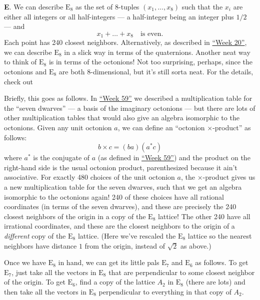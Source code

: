 \documentclass{article}
\def\tightlist{}
\renewcommand{\texttt}[1]{%
  \begingroup
  \ttfamily
  \begingroup\lccode`~=`/\lowercase{\endgroup\def~}{/\discretionary{}{}{}}%
  \begingroup\lccode`~=`[\lowercase{\endgroup\def~}{[\discretionary{}{}{}}%
  \begingroup\lccode`~=`.\lowercase{\endgroup\def~}{.\discretionary{}{}{}}%
  \catcode`/=\active\catcode`[=\active\catcode`.=\active
  \scantokens{#1\noexpand}%
  \endgroup
}
\begin{document}
\textbf{E}. We can describe \(\mathrm{E}_8\) as the set of 8-tuples
\((x_1,...,x_8)\) such that the \(x_i\) are either all integers or all
half-integers --- a half-integer being an integer plus \(1/2\) --- and
\[x_1+\ldots+x_8\quad\text{is even}.\] Each point has 240 closest
neighbors. Alternatively, as described in
\protect\hyperlink{week20}{``Week 20''}, we can describe
\(\mathrm{E}_8\) in a slick way in terms of the quaternions. Another
neat way to think of \(\mathrm{E}_8\) is in terms of the octonions! Not
too surprising, perhaps, since the octonions and \(\mathrm{E}_8\) are
both 8-dimensional, but it's still sorta neat. For the details, check
out


Briefly, this goes as follows. In \protect\hyperlink{week59}{``Week
59''} we described a multiplication table for the ``seven dwarves'' ---
a basis of the imaginary octonions --- but there are lots of other
multiplication tables that would also give an algebra isomorphic to the
octonions. Given any unit octonion \(a\), we can define an ``octonion
\(\times\)-product'' as follows: \[b \times c = (b a)(a^* c)\] where
\(a^*\) is the conjugate of \(a\) (as defined in
\protect\hyperlink{week59}{``Week 59''}) and the product on the
right-hand side is the usual octonion product, parenthesized because it
ain't associative. For exactly 480 choices of the unit octonion \(a\),
the \(\times\)-product gives us a new multiplication table for the seven
dwarves, such that we get an algebra isomorphic to the octonions again!
240 of these choices have all rational coordinates (in terms of the
seven dwarves), and these are precisely the 240 closest neighbors of the
origin in a copy of the \(\mathrm{E}_8\) lattice! The other 240 have all
irrational coordinates, and these are the closest neighbors to the
origin of a \emph{different} copy of the \(\mathrm{E}_8\) lattice. (Here
we've rescaled the \(\mathrm{E}_8\) lattice so the nearest neighbors
have distance \(1\) from the origin, instead of \(\sqrt{2}\) as above.)

Once we have \(\mathrm{E}_8\) in hand, we can get its little pals
\(\mathrm{E}_7\) and \(\mathrm{E}_6\) as follows. To get
\(\mathrm{E}_7\), just take all the vectors in \(\mathrm{E}_8\) that are
perpendicular to some closest neighbor of the origin. To get
\(\mathrm{E}_6\), find a copy of the lattice \(A_2\) in \(\mathrm{E}_8\)
(there are lots) and then take all the vectors in \(\mathrm{E}_8\)
perpendicular to everything in that copy of \(A_2\).
\end{document}
